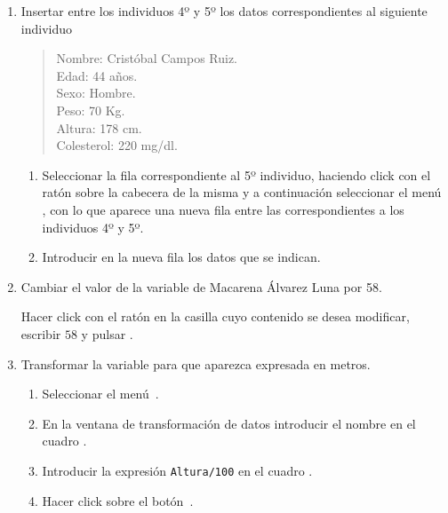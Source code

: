 \begin{enumerate}[leftmargin=*]
\begin{enumerate}
\item Insertar entre los individuos 4º y 5º los datos correspondientes al siguiente individuo
\begin{quote}
Nombre: Cristóbal Campos Ruiz.\\
Edad: 44 años.\\
Sexo: Hombre.\\
Peso: 70 Kg.\\
Altura: 178 cm.\\
Colesterol: 220 mg/dl.
\end{quote}

\begin{indicacion}
\begin{enumerate}
\item Seleccionar la fila correspondiente al 5º individuo, haciendo click con el ratón sobre la cabecera de la misma y a continuación seleccionar el menú , con lo que aparece una nueva fila entre las correspondientes a los individuos 4º y 5º.
\item Introducir en la nueva fila los datos que se indican.
\end{enumerate}
\end{indicacion}


\item Cambiar el valor de la variable  de Macarena Álvarez Luna por 58.
\begin{indicacion}
Hacer click con el ratón en la casilla cuyo contenido se desea modificar, escribir $58$ y pulsar .
\end{indicacion}

\item Transformar la variable  para que aparezca expresada en metros.
\begin{indicacion}
\begin{enumerate}
\item Seleccionar el menú~.
\item En la ventana de transformación de datos introducir el nombre  en el cuadro .
\item Introducir la expresión \texttt{Altura/100} en el cuadro .
\item Hacer click sobre el botón~. 
\end{enumerate}
\end{indicacion}


\end{enumerate}
\end{enumerate}
